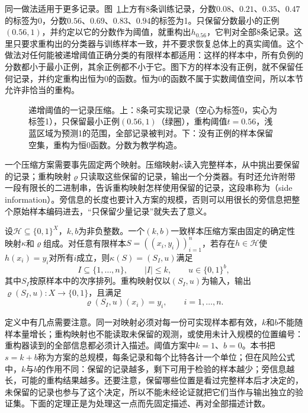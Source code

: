 同一做法适用于更多记录。图~\ref{fig:lt7a-threshold-compression}上方有8条训练记录，分数$0.08$、$0.21$、$0.35$、$0.47$的标签为0，分数$0.56$、$0.69$、$0.83$、$0.94$的标签为1。只保留分数最小的正例$(0.56,1)$，并约定以它的分数作为阈值，就重构出$h_{0.56}$，它判对全部8条记录。这里只要求重构出的分类器与训练样本一致，并不要求恢复总体上的真实阈值。这个做法对任何能被递增阈值正确分类的有限样本都适用：这样的样本中，所有负例的分数都小于最小正例，其余正例都不小于它。图下方的样本没有正例，就不保留任何记录，并约定重构出恒为0的函数。恒为0的函数不属于实数阈值空间，所以本节允许非恰当的重构。

\begin{figure}[htbp]
 \centering
 
 \caption{递增阈值的一记录压缩。上：8条可实现记录（空心为标签0，实心为标签1），只保留最小正例$(0.56,1)$（绿圈），重构阈值$t=0.56$，浅蓝区域为预测1的范围，全部记录被判对。下：没有正例的样本保留空集，重构为恒0函数。分数为教学构造。}
 \label{fig:lt7a-threshold-compression}
\end{figure}

一个压缩方案需要事先固定两个映射。压缩映射$\kappa$读入完整样本，从中挑出要保留的记录；重构映射$\varrho$只读取这些保留的记录，输出一个分类器。有时还允许附带一段有限长的二进制串，告诉重构映射怎样使用保留的记录，这段串称为（side information）。旁信息的长度也要计入方案的规模，否则可以用很长的旁信息把整个原始样本编码进去，“只保留少量记录”就失去了意义。

\begin{definition}[一致样本压缩方案]
\label{def:sample-compression}
设$\mathcal H\subseteq\{0,1\}^X$，$k,b$为非负整数。一个$(k,b)$一致样本压缩方案由固定的确定性映射$\kappa$和$\varrho$组成。对任意有限样本$S=((x_i,y_i))_{i=1}^n$，若存在$h\in\mathcal H$使$h(x_i)=y_i$对所有$i$成立，则$\kappa(S)=(S_I,u)$满足
\[
 I\subseteq\{1,\ldots,n\},\qquad |I|\leq k,\qquad u\in\{0,1\}^b,
\]
其中$S_I$按原样本中的次序排列。重构映射仅以$(S_I,u)$为输入，输出$\varrho(S_I,u):X\to\{0,1\}$，且满足
\[
 \varrho(S_I,u)(x_i)=y_i,\qquad i=1,\ldots,n.
\]
\end{definition}

定义中有几点需要注意。同一对映射必须对每一份可实现样本都有效，$k$和$b$不能随样本量增长；重构映射也不能读取未保留的观测，或使用未计入规模的位置编号：重构器读到的全部信息都必须计入描述。阈值方案中$k=1$、$b=0$。本书把$s=k+b$称为方案的总规模，每条记录和每个比特各计一个单位；但在风险公式中，$k$与$b$的作用不同：保留的记录越多，剩下可用于检验的样本越少；旁信息越长，可能的重构结果越多。还要注意，保留哪些位置是看过完整样本后才决定的，未保留的记录也参与了这个决定，所以不能未经论证就把它们当作与输出独立的验证集。下面的定理正是为处理这一点而先固定描述、再对全部描述计数。

